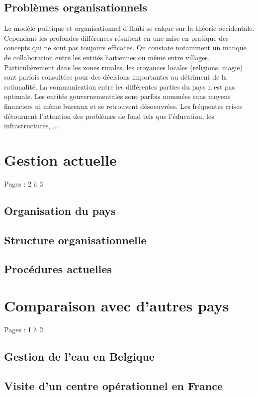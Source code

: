\documentclass{eplmastersthesis_FR}
\begin{document}
			\subsection*{Problèmes organisationnels}
				Le modèle politique et organisationnel d'Haïti se calque sur la théorie occidentale. Cependant les profondes différences résultent en une mise en pratique des concepts qui ne sont pas toujours efficaces.
				On constate notamment un manque de collaboration entre les entités haïtiennes ou même entre villages. Particulièrement dans les zones rurales, les croyances locales (religions, magie) sont parfois consultées pour des décisions importantes au détriment de la rationalité. La communication entre les différentes parties du pays n'est pas optimale. Les entités gouvernementales sont parfois nommées sans moyens financiers ni même bureaux et se retrouvent désoeuvrées. Les fréquentes crises détournent l'attention des problèmes de fond tels que l'éducation, les infrastructures, ...

		\section{Gestion actuelle}

			Pages : 2 à 3

			\subsection*{Organisation du pays}
			\subsection*{Structure organisationnelle}
			\subsection*{Procédures actuelles}

		\section{Comparaison avec d'autres pays}

			Pages : 1 à 2

			\subsection*{Gestion de l'eau en Belgique}
			\subsection*{Visite d'un centre opérationnel en France}
\end{document}
